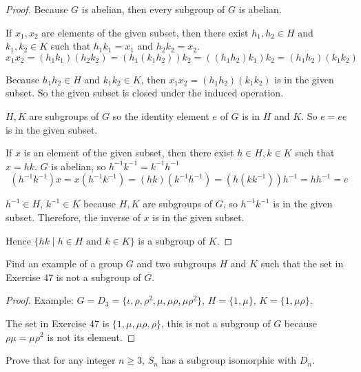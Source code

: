 \begin{proof}
    Because $G$ is abelian, then every subgroup of $G$ is abelian.

    If $x_{1}, x_{2}$ are elements of the given subset, then there exist $h_{1}, h_{2}\in H$ and $k_{1}, k_{2}\in K$ such that $h_{1}k_{1} = x_{1}$ and $h_{2}k_{2} = x_{2}$.
    \[
        x_{1}x_{2} = (h_{1}k_{1})(h_{2}k_{2}) = (h_{1}(k_{1}h_{2}))k_{2} = ((h_{1}h_{2})k_{1})k_{2} = (h_{1}h_{2})(k_{1}k_{2})
    \]

    Because $h_{1}h_{2}\in H$ and $k_{1}k_{2}\in K$, then $x_{1}x_{2} = (h_{1}h_{2})(k_{1}k_{2})$ is in the given subset. So the given subset is closed under the induced operation.

    $H, K$ are subgroups of $G$ so the identity element $e$ of $G$ is in $H$ and $K$. So $e = ee$ is in the given subset.

    If $x$ is an element of the given subset, then there exist $h\in H, k\in K$ such that $x = hk$. $G$ is abelian, so $h^{-1}k^{-1} = k^{-1}h^{-1}$
    \[
        (h^{-1}k^{-1})x = x(h^{-1}k^{-1}) = (hk)(k^{-1}h^{-1}) = (h(kk^{-1}))h^{-1} = hh^{-1} = e
    \]

    $h^{-1}\in H$, $k^{-1}\in K$ because $H, K$ are subgroups of $G$, so $h^{-1}k^{-1}$ is in the given subset. Therefore, the inverse of $x$ is in the given subset.

    Hence $\{ hk \mid h\in H \text{ and } k\in K \}$ is a subgroup of $K$.
\end{proof}

\begin{exercise}
    Find an example of a group $G$ and two subgroups $H$ and $K$ such that the set in Exercise 47 is not a subgroup of $G$.
\end{exercise}

\begin{proof}
    Example: $G = D_{3} = \{ \iota, \rho, \rho^{2}, \mu, \mu\rho, \mu\rho^{2} \}$, $H = \{ 1, \mu \}$, $K = \{ 1, \mu\rho \}$.

    The set in Exercise 47 is $\{ 1, \mu, \mu\rho, \rho \}$, this is not a subgroup of $G$ because $\rho\mu = \mu\rho^{2}$ is not its element.
\end{proof}

\begin{exercise}
    Prove that for any integer $n\geq 3$, $S_{n}$ has a subgroup isomorphic with $D_{n}$.
\end{exercise}

